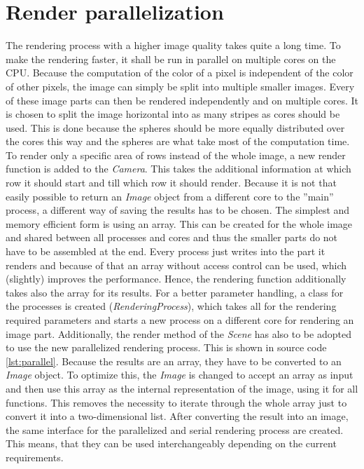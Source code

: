 \documentclass[12pt]{report}
\begin{document}
\chapter{Render parallelization}
The rendering process with a higher image quality takes quite a long time. To make the rendering faster, it shall be run in parallel on multiple cores on the CPU. Because the computation of the color of a pixel is independent of the color of other pixels, the image can simply be split into multiple smaller images. Every of these image parts can then be rendered independently and on multiple cores. It is chosen to split the image horizontal into as many stripes as cores should be used. This is done because the spheres should be more equally distributed over the cores this way and the spheres are what take most of the computation time. To render only a specific area of rows instead of the whole image, a new render function is added to the \textit{Camera}. This takes the additional information at which row it should start and till which row it should render. Because it is not that easily possible to return an \textit{Image} object from a different core to the ''main'' process, a different way of saving the results has to be chosen. The simplest and memory efficient form is using an array. This can be created for the whole image and shared between all processes and cores and thus the smaller parts do not have to be assembled at the end. Every process just writes into the part it renders and because of that an array without access control can be used, which (slightly) improves the performance. Hence, the rendering function additionally takes also the array for its results. For a better parameter handling, a class for the processes is created (\textit{RenderingProcess}), which takes all for the rendering required parameters and starts a new process on a different core for rendering an image part. Additionally, the render method of the \textit{Scene} has also to be adopted to use the new parallelized rendering process. This is shown in source code \ref{lst:parallel}. Because the results are an array, they have to be converted to an \textit{Image} object. To optimize this, the \textit{Image} is changed to accept an array as input and then use this array as the internal representation of the image, using it for all functions. This removes the necessity to iterate through the whole array just to convert it into a two-dimensional list. After converting the result into an image, the same interface for the parallelized and serial rendering process are created. This means, that they can be used interchangeably depending on the current requirements.
\end{document}
